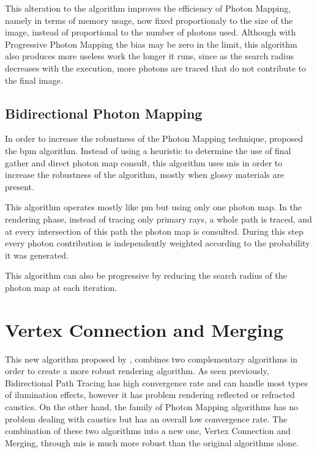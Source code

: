 This alteration to the algorithm improves the efficiency of Photon Mapping, namely in terms of memory usage, now fixed proportionaly to the size of the image, instead of proportional to the number of photons used. Although with Progressive Photon Mapping the bias may be zero in the limit, this algorithm also produces more useless work the longer it runs, since as the search radius decreases with the execution, more photons are traced that do not contribute to the final image.

\subsection{Bidirectional Photon Mapping}

In order to increase the robustness of the Photon Mapping technique, \cite{Vorba} proposed the \gls{bpm} algorithm. Instead of using a heuristic to determine the use of final gather and direct photon map consult, this algorithm uses \gls{mis} in order to increase the robustness of the algorithm, mostly when glossy materials are present.

This algorithm operates mostly like \gls{pm} but using only one photon map. In the rendering phase, instead of tracing only primary rays, a whole path is traced, and at every intersection of this path the photon map is consulted. During this step every photon contribution is independently weighted according to the probability it was generated.

This algorithm can also be progressive by reducing the search radius of the photon map at each iteration.

\section{Vertex Connection and Merging}

This new algorithm proposed by \cite{Georgiev}, combines two complementary algorithms in order to create a more robust rendering algorithm. As seen previously, Bidirectional Path Tracing has high convergence rate and can handle most types of ilumination effects, however it has problem rendering reflected or refracted caustics. On the other hand, the family of Photon Mapping algorithms has no problem dealing with caustics but has an overall low convergence rate. The combination of these two algorithms into a new one, Vertex Connection and Merging, through \gls{mis} is much more robust than the original algorithms alone.

